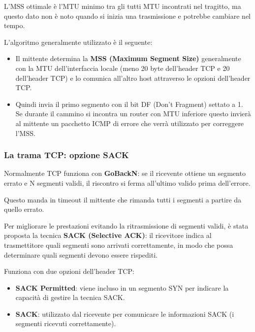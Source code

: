            L'MSS ottimale è l'MTU minimo tra gli tutti MTU incontrati nel tragitto, ma questo dato non è noto quando si inizia una trasmissione e potrebbe cambiare nel tempo.
        
            L'algoritmo generalmente utilizzato è il seguente:
            \begin{itemize}
                \item Il mittente determina la \textbf{MSS (Maximum Segment Size)} generalmente con la MTU dell'interfaccia locale (meno 20 byte dell'header TCP e 20 dell'header TCP) e lo comunica all'altro host attraverso le opzioni dell'header TCP.
                \item Quindi invia il primo segmento con il bit DF (Don't Fragment) settato a 1. Se durante il cammino si incontra un router con MTU inferiore questo invierà al mittente un pacchetto ICMP di errore che verrà utilizzato per correggere l'MSS.
            \end{itemize}

        \subsubsection{La trama TCP: opzione SACK}
            Normalmente TCP funziona con \textbf{GoBackN}: se il ricevente ottiene un segmento errato e N segmenti validi, il riscontro si ferma all'ultimo valido prima dell'errore.
        
            Questo manda in timeout il mittente che rimanda tutti i segmenti a partire da quello errato.
        
            Per migliorare le prestazioni evitando la ritrasmissione di segmenti validi, è stata proposta la tecnica \textbf{SACK (Selective ACK)}: il ricevitore indica al trasmettitore quali segmenti sono arrivati correttamente, in modo che possa determinare quali segmenti devono essere rispediti.
        
            Funziona con due opzioni dell'header TCP:
            \begin{itemize}
                \item \textbf{SACK Permitted}: viene incluso in un segmento SYN per indicare la capacità di gestire la tecnica SACK.
                \item \textbf{SACK}: utilizzato dal ricevente per comunicare le informazioni SACK (i segmenti ricevuti correttamente).
            \end{itemize}

